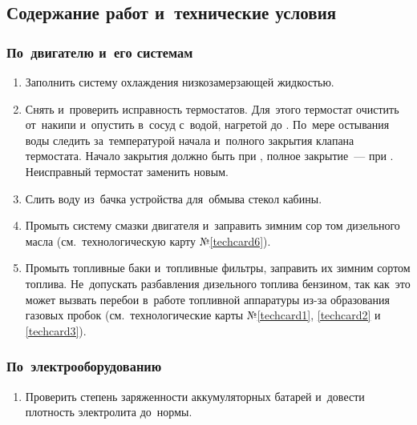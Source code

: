 \subsection{Содержание работ и~технические условия}
\subsubsection{По~двигателю и~его системам}
\begin{enumerate}
    \item Заполнить систему охлаждения низкозамерзающей жидкостью. 
    \item Снять и~проверить исправность термостатов. Для~этого термостат очистить от~накипи и~опустить в~сосуд с~водой, нагретой до \celc{}. По~мере остывания воды следить за~температурой начала и~полного закрытия клапана термостата. Начало закрытия должно быть при \celc{}, полное закрытие~--- при . Неисправный термостат заменить новым. 
    \item Слить воду из~бачка устройства для~обмыва стекол кабины. 
    \item Промыть систему смазки двигателя и~заправить зимним сор том дизельного масла (см.~технологическую карту №\ref{techcard6}). 
    \item Промыть топливные баки и~топливные фильтры, заправить их зимним сортом топлива. Не~допускать разбавления дизельного топлива бензином, так как~это может вызвать перебои в~работе топливной аппаратуры из-за образования газовых пробок (см.~технологические карты №\ref{techcard1}, \ref{techcard2} и \ref{techcard3}). 
\end{enumerate}

\subsubsection{По~электрооборудованию}
\begin{enumerate}
    \item Проверить степень заряженности аккумуляторных батарей и~довести плотность электролита до~нормы.
\end{enumerate}

